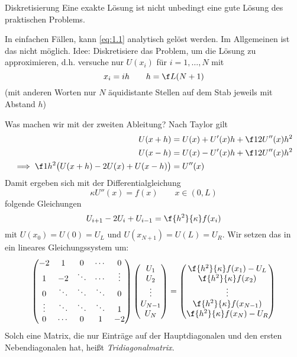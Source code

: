 \documentclass[a4paper]{scrartcl}
\numberwithin{equation}{section}
\begin{document}
\begin{seg}{Diskretisierung}
Eine exakte Lösung ist nicht unbedingt eine gute Lösung des praktischen Problems.

In einfachen Fällen, kann \ref{eq:1.1} analytisch gelöst werden. Im Allgemeinen ist das nicht möglich.
Idee: Diskretisiere das Problem, um die Lösung zu approximieren, d.h. versuche nur $U(x_i)$ für $i=1,\ldots,N$ mit
\[
	x_i = ih \qquad h=\f L {(N+1)}
\]
(mit anderen Worten nur $N$ äquidistante Stellen auf dem Stab jeweils mit Abstand $h$)

Was machen wir mit der zweiten Ableitung?
Nach Taylor gilt
\begin{align*}
U(x+h) &= U(x) +U'(x)h + \f 1 2 U''(x)h^2\\
U(x-h) &= U(x) - U'(x)h + \f 1 2 U''(x)h^2\\
\implies \f 1 {h^2} \big(U(x+h) - 2U(x) + U(x-h)\big) &= U''(x)
\end{align*}
Damit ergeben sich mit der Differentialgleichung
\[
	\kappa U''(x) = f(x) \qquad	x \in (0,L)
\]
folgende Gleichungen
\[
	U_{i+1} - 2U_i + U_{i-1} = \f {h^2}{\kappa}f(x_i)
\]
mit $U(x_0) = U(0) = U_L$ und $U(x_{N+1}) = U(L) = U_R$.
Wir setzen das in ein lineares Gleichungssystem um:
\[
	\begin{pmatrix}
 -2      & 1       & 0       & \cdots   & 0   \\
 1       & -2      & \ddots      & \cdots   & \vdots   \\
 0       & \ddots  & \ddots  & \ddots   & 0 \\
\vdots   & \ddots  & \ddots  & \ddots   & 1       \\
0        & \cdots  & 0       &  1      & -2 \\
\end{pmatrix}
\begin{pmatrix}
 U_1  \\ U_2 \\  \vdots \\ U_{N-1} \\ U_N \\
\end{pmatrix}
=
\begin{pmatrix}
	\f {h^2}{\kappa} f(x_1)-U_L \\ \f {h^2}{\kappa}f(x_2) \\ \vdots \\ \f {h^2}{\kappa} f(x_{N-1}) \\ \f {h^2}{\kappa} f(x_N)-U_R \\
\end{pmatrix}
\]
Solch eine Matrix, die nur Einträge auf der Hauptdiagonalen und
den ersten Nebendiagonalen hat, heißt \emph{Tridiagonalmatrix}.
\end{seg}
\end{document}
